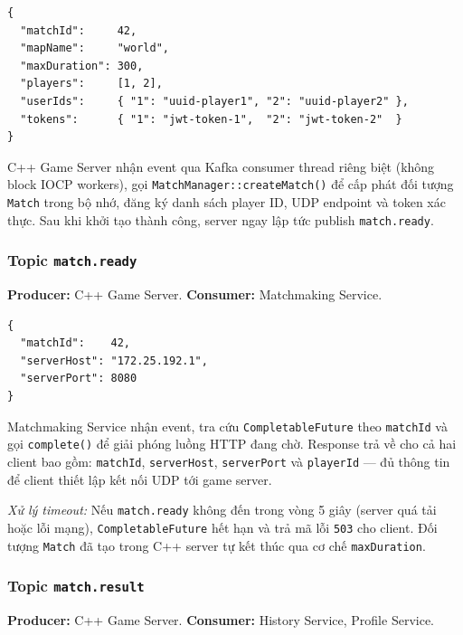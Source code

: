 \documentclass[12pt,a4paper]{report}
\newcommand{\topic}[1]{\texttt{\textcolor{micropurple}{#1}}}
\begin{document}
\begin{lstlisting}[style=jsonStyle,
  caption={Payload topic \texttt{match.create} (Matchmaking -> C++ Server)}]
{
  "matchId":     42,
  "mapName":     "world",
  "maxDuration": 300,
  "players":     [1, 2],
  "userIds":     { "1": "uuid-player1", "2": "uuid-player2" },
  "tokens":      { "1": "jwt-token-1",  "2": "jwt-token-2"  }
}
\end{lstlisting}

C++ Game Server nhận event qua Kafka consumer thread riêng biệt (không block IOCP workers),
gọi \texttt{MatchManager::createMatch()} để cấp phát đối tượng \texttt{Match} trong bộ nhớ,
đăng ký danh sách player ID, UDP endpoint và token xác thực. Sau khi khởi tạo thành công,
server ngay lập tức publish \topic{match.ready}.

\subsubsection{Topic \texttt{match.ready}}

\textbf{Producer:} C++ Game Server. \quad \textbf{Consumer:} Matchmaking Service.

\begin{lstlisting}[style=jsonStyle,
  caption={Payload topic \texttt{match.ready} (C++ Server -> Matchmaking)}]
{
  "matchId":    42,
  "serverHost": "172.25.192.1",
  "serverPort": 8080
}
\end{lstlisting}

Matchmaking Service nhận event, tra cứu \texttt{CompletableFuture} theo \texttt{matchId} và
gọi \texttt{complete()} để giải phóng luồng HTTP đang chờ. Response trả về cho cả hai client
bao gồm: \texttt{matchId}, \texttt{serverHost}, \texttt{serverPort} và \texttt{playerId} ---
đủ thông tin để client thiết lập kết nối UDP tới game server.

\textit{Xử lý timeout:} Nếu \topic{match.ready} không đến trong vòng 5 giây (server quá
tải hoặc lỗi mạng), \texttt{CompletableFuture} hết hạn và trả mã lỗi \texttt{503} cho
client. Đối tượng \texttt{Match} đã tạo trong C++ server tự kết thúc qua cơ chế
\texttt{maxDuration}.

\subsubsection{Topic \texttt{match.result}}

\textbf{Producer:} C++ Game Server. \quad \textbf{Consumer:} History Service, Profile Service.
\end{document}
